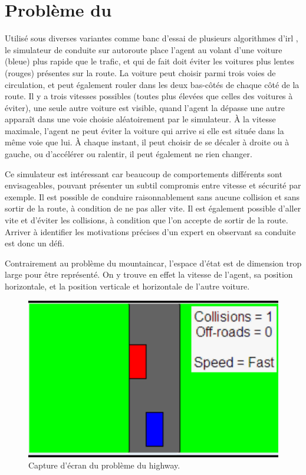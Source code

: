 \documentclass[frenchb,a4paper,justified,notoc]{tufte-book}
\begin{document}
\section{Problème du }
\label{sec-9-3}
\label{hier-highway}

Utilisé sous diverses variantes comme banc d'essai de plusieurs algorithmes d'\gls{irl} \citep{abbeel2004apprenticeship,syed2008game,syed2008apprenticeship}, le simulateur de conduite sur autoroute place l'agent au volant d'une voiture (bleue) plus rapide que le trafic, et qui de fait doit éviter les voitures plus lentes (rouges) présentes sur la route. La voiture peut choisir parmi trois voies de circulation, et peut également rouler dans les deux bas-côtés de chaque côté de la route. Il y a trois vitesses possibles (toutes plus élevées que celles des voitures à éviter), une seule autre voiture est visible, quand l'agent la dépasse une autre apparaît dans une voie choisie aléatoirement par le simulateur. \`A la vitesse maximale, l'agent ne peut éviter la voiture qui arrive si elle est située dans la même voie que lui. \`A chaque instant, il peut choisir de se décaler à droite ou à gauche, ou d'accélérer ou ralentir, il peut également ne rien changer.

Ce simulateur est intéressant car beaucoup de comportements différents sont envisageables, pouvant présenter un subtil compromis entre vitesse et sécurité par exemple. Il est possible de conduire raisonnablement sans aucune collision et sans sortir de la route, à condition de ne pas aller vite. Il est également possible d'aller vite et d'éviter les collisions, à condition que l'on accepte de sortir de la route. Arriver à identifier les motivations précises d'un expert en observant sa conduite est donc un défi.

Contrairement au problème du \gls{mountaincar}, l'espace d'état est de dimension trop large pour être représenté. On y trouve en effet la vitesse de l'agent, sa position horizontale, et la position verticale et horizontale de l'autre voiture.
\begin{figure}
\centering
\includegraphics[width=.5\textwidth]{Figures/Highway.png}
\caption[Capture d'écran du problème du \gls{highway}]{Capture d'écran du problème du \gls{highway}.}
\label{fig:highwayscreenshot}
\end{figure}
\end{document}
